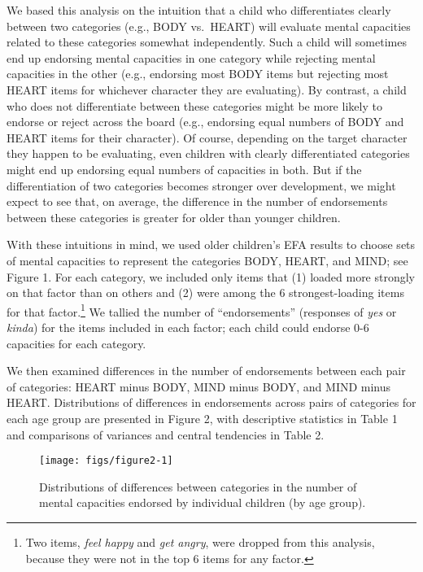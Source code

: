 \documentclass[10pt, letterpaper]{article}
\newenvironment{CodeChunk}{}{}
\begin{document}
We based this analysis on the intuition that a child who differentiates
clearly between two categories (e.g., BODY vs.~HEART) will evaluate
mental capacities related to these categories somewhat independently.
Such a child will sometimes end up endorsing mental capacities in one
category while rejecting mental capacities in the other (e.g., endorsing
most BODY items but rejecting most HEART items for whichever character
they are evaluating). By contrast, a child who does not differentiate
between these categories might be more likely to endorse or reject
across the board (e.g., endorsing equal numbers of BODY and HEART items
for their character). Of course, depending on the target character they
happen to be evaluating, even children with clearly differentiated
categories might end up endorsing equal numbers of capacities in both.
But if the differentiation of two categories becomes stronger over
development, we might expect to see that, on average, the difference in
the number of endorsements between these categories is greater for older
than younger children.

With these intuitions in mind, we used older children's EFA results to
choose sets of mental capacities to represent the categories BODY,
HEART, and MIND; see Figure 1. For each category, we included only items
that (1) loaded more strongly on that factor than on others and (2) were
among the 6 strongest-loading items for that
factor.\footnote{Two items, \textit{feel happy} and \textit{get angry}, were dropped from this analysis, because they were not in the top 6 items for any factor.}
We tallied the number of ``endorsements'' (responses of \emph{yes} or
\emph{kinda}) for the items included in each factor; each child could
endorse 0-6 capacities for each category.

We then examined differences in the number of endorsements between each
pair of categories: HEART minus BODY, MIND minus BODY, and MIND minus
HEART. Distributions of differences in endorsements across pairs of
categories for each age group are presented in Figure 2, with
descriptive statistics in Table 1 and comparisons of variances and
central tendencies in Table 2.

\begin{CodeChunk}
\begin{figure}[tb]
\texttt{[image: figs/figure2-1]} \caption[Distributions of differences between categories in the number of mental capacities endorsed by individual children (by age group)]{Distributions of differences between categories in the number of mental capacities endorsed by individual children (by age group).}\label{fig:figure2}
\end{figure}
\end{CodeChunk}
\end{document}
